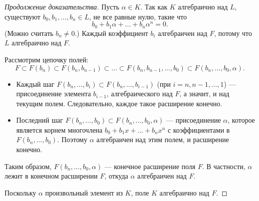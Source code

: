 \begin{proof}[Продолжение доказательства]
    Пусть \(\alpha \in K\). Так как \(K\) алгебраично над \(L\), существуют \(b_0, b_1, \dots, b_n \in L\), не все равные нулю, такие что
    \[
    b_0 + b_1\alpha + \dots + b_n\alpha^n = 0.
    \]
    (Можно считать \(b_n \ne 0\).) Каждый коэффициент \(b_i\) алгебраичен над \(F\), потому что \(L\) алгебраично над \(F\).

    Рассмотрим цепочку полей:
    \[
    F \subset F(b_n) \subset F(b_n, b_{n-1}) \subset \dots \subset F(b_n, b_{n-1}, \dots, b_0) \subset F(b_n, \dots, b_0, \alpha).
    \]
    \begin{itemize}
        \item Каждый шаг \(F(b_n, \dots, b_{i}) \subset F(b_n, \dots, b_{i-1})\) (при \(i = n, n-1, \dots, 1\)) — присоединение элемента \(b_{i-1}\), алгебраического над \(F\), а значит, и над текущим полем. Следовательно, каждое такое расширение конечно.
        \item Последний шаг \(F(b_n, \dots, b_0) \subset F(b_n, \dots, b_0, \alpha)\) — присоединение \(\alpha\), которое является корнем многочлена \(b_0 + b_1x + \dots + b_nx^n\) с коэффициентами в \(F(b_n, \dots, b_0)\). Поэтому \(\alpha\) алгебраичен над этим полем, и расширение конечно.
    \end{itemize}
    Таким образом, \(F(b_n, \dots, b_0, \alpha)\) — конечное расширение поля \(F\). В частности, \(\alpha\) лежит в конечном расширении \(F\), откуда \(\alpha\) алгебраичен над \(F\).

    Поскольку \(\alpha\) произвольный элемент из \(K\), поле \(K\) алгебраично над \(F\).
\end{proof}


